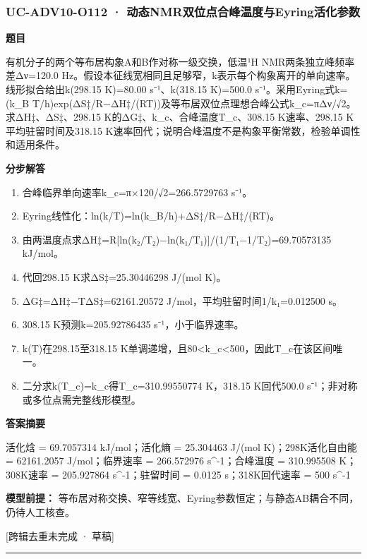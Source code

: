 \documentclass[UTF8,11pt,a4paper]{ctexart}
\begin{document}
\subsubsection*{UC-ADV10-O112 · 动态NMR双位点合峰温度与Eyring活化参数}
\noindent\textbf{题目}\par
有机分子的两个等布居构象A和B作对称一级交换，低温¹H NMR两条独立峰频率差Δν=120.0 Hz。假设本征线宽相同且足够窄，k表示每个构象离开的单向速率。线形拟合给出k(298.15 K)=80.00 s⁻¹、k(318.15 K)=500.0 s⁻¹。采用Eyring式k=(k\_B T/h)exp(ΔS‡/R−ΔH‡/(RT))及等布居双位点理想合峰公式k\_c=πΔν/√2。求ΔH‡、ΔS‡、298.15 K的ΔG‡、k\_c、合峰温度T\_c、308.15 K速率、298.15 K平均驻留时间及318.15 K速率回代；说明合峰温度不是构象平衡常数，检验单调性和适用条件。\par
\medskip\noindent\textbf{分步解答}
\begin{enumerate}
\item 合峰临界单向速率k\_c=π×120/√2=266.5729763 s⁻¹。
\item Eyring线性化：ln(k/T)=ln(k\_B/h)+ΔS‡/R−ΔH‡/(RT)。
\item 由两温度点求ΔH‡=R[ln(k₂/T₂)−ln(k₁/T₁)]/(1/T₁−1/T₂)=69.70573135 kJ/mol。
\item 代回298.15 K求ΔS‡=25.30446298 J/(mol K)。
\item ΔG‡=ΔH‡−TΔS‡=62161.20572 J/mol，平均驻留时间1/k₁=0.012500 s。
\item 308.15 K预测k=205.92786435 s⁻¹，小于临界速率。
\item k(T)在298.15至318.15 K单调递增，且80<k\_c<500，因此T\_c在该区间唯一。
\item 二分求k(T\_c)=k\_c得T\_c=310.99550774 K，318.15 K回代500.0 s⁻¹；非对称或多位点需完整线形模型。
\end{enumerate}
\noindent\textbf{答案摘要}\par
活化焓 = 69.7057314 kJ/mol；活化熵 = 25.304463 J/(mol K)；298K活化自由能 = 62161.2057 J/mol；临界速率 = 266.572976 s\textasciicircum{}-1；合峰温度 = 310.995508 K；308K速率 = 205.927864 s\textasciicircum{}-1；驻留时间 = 0.0125 s；318K回代速率 = 500 s\textasciicircum{}-1\par
\noindent\textbf{模型前提：}
等布居对称交换、窄等线宽、Eyring参数恒定；与静态AB耦合不同，仍待人工核查。\par
\noindent\textcolor{red!65!black}{[跨辑去重未完成 · 草稿]} \par
\medskip\hrule\medskip
{}
\end{document}
